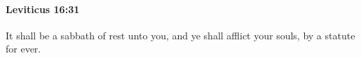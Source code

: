 
		\paragraph{Leviticus 16:31} %
			\label{LEVITICUS-16-31}

			It shall be a sabbath of rest unto you, and ye shall afflict your souls, by a statute for ever.


